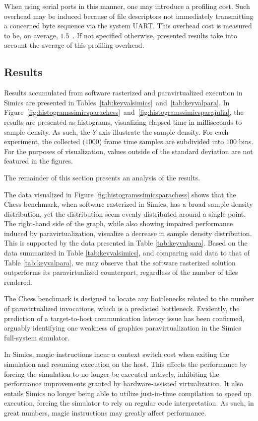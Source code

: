 \documentclass{article}
\begin{document}
When using serial ports in this manner, one may introduce a profiling cost.
Such overhead may be induced because of file descriptors not immediately transmitting a concerned byte sequence via the system UART.
This overhead cost is measured to be, on average, $1.5$~\milli\second .
If not specified otherwise, presented results take into account the average of this profiling overhead.

\subsection{Results}
\label{sec:results}
Results accumulated from software rasterized and paravirtualized execution in Simics are presented in Tables~\ref{tab:keyvalsimics}~and~\ref{tab:keyvalpara}.
In Figure~\ref{fig:histogramssimicsparachess}~and~\ref{fig:histogramssimicsparajulia}, the results are presented as histograms, visualizing elapsed time in milliseconds to sample density.
As such, the $Y$ axis illustrate the sample density.
For each experiment, the collected ($1000$) frame time samples are subdivided into $100$ bins.
For the purposes of visualization, values outside of the standard deviation are not featured in the figures.

The remainder of this section presents an analysis of the results.

The data visualized in Figure \ref{fig:histogramssimicsparachess} shows that the Chess benchmark, when software rasterized in Simics, has a broad sample density distribution, yet the distribution seem evenly distributed around a single point.
The right-hand side of the graph, while also showing impaired performance induced by paravirtualization, visualize a decrease in sample density distribution.
This is supported by the data presented in Table \ref{tab:keyvalpara}.
Based on the data summarized in Table \ref{tab:keyvalsimics}, and comparing said data to that of Table \ref{tab:keyvalpara}, we may observe that the software rasterized solution outperforms its paravirtualized counterpart, regardless of the number of tiles rendered.

The Chess benchmark is designed to locate any bottlenecks related to the number of paravirtualized invocations, which is a predicted bottleneck.
Evidently, the prediction of a target-to-host communication latency issue has been confirmed, arguably identifying one weakness of graphics paravirtualization in the Simics full-system simulator.

In Simics, magic instructions incur a context switch cost when exiting the simulation and resuming execution on the host.
This affects the performance by forcing the simulation to no longer be executed natively, inhibiting the performance improvements granted by hardware-assisted virtualization.
It also entails Simics no longer being able to utilize just-in-time compilation to speed up execution, forcing the simulator to rely on regular code interpretation.
As such, in great numbers, magic instructions may greatly affect performance.
\end{document}
